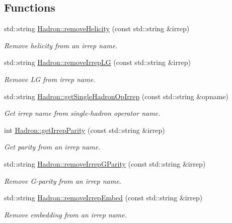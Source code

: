 \subsection*{Functions}
\begin{DoxyCompactItemize}
\item 
std\+::string \mbox{\hyperlink{namespaceHadron_a877ae1e797f5cf4d4ebb7e22d5bbe69b}{Hadron\+::remove\+Helicity}} (const std\+::string \&irrep)
\begin{DoxyCompactList}\small\item\em Remove helicity from an irrep name. \end{DoxyCompactList}\item 
std\+::string \mbox{\hyperlink{namespaceHadron_aff55b5fd81ffee95432b7d4e1c8d01e6}{Hadron\+::remove\+Irrep\+LG}} (const std\+::string \&irrep)
\begin{DoxyCompactList}\small\item\em Remove LG from irrep name. \end{DoxyCompactList}\item 
std\+::string \mbox{\hyperlink{namespaceHadron_a9b05418ba46746a99fb402de358096d3}{Hadron\+::get\+Single\+Hadron\+Op\+Irrep}} (const std\+::string \&opname)
\begin{DoxyCompactList}\small\item\em Get irrep name from single-\/hadron operator name. \end{DoxyCompactList}\item 
int \mbox{\hyperlink{namespaceHadron_af182dccf3462f82247a3d86df38c2da0}{Hadron\+::get\+Irrep\+Parity}} (const std\+::string \&irrep)
\begin{DoxyCompactList}\small\item\em Get parity from an irrep name. \end{DoxyCompactList}\item 
std\+::string \mbox{\hyperlink{namespaceHadron_a6c2109897dff664c15b3fe81aa7d8917}{Hadron\+::remove\+Irrep\+G\+Parity}} (const std\+::string \&irrep)
\begin{DoxyCompactList}\small\item\em Remove G-\/parity from an irrep name. \end{DoxyCompactList}\item 
std\+::string \mbox{\hyperlink{namespaceHadron_a828226a1b80591d5791be7e1bc155220}{Hadron\+::remove\+Irrep\+Embed}} (const std\+::string \&irrep)
\begin{DoxyCompactList}\small\item\em Remove embedding from an irrep name. \end{DoxyCompactList}\item 

\end{DoxyCompactItemize}
